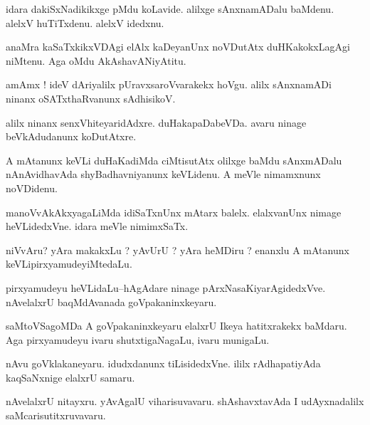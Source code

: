 \documentclass{article}
\begin{document}
\begin{mn}%
idara dakiSxNadikikxge pMdu koLavide. alilxge sAnxnamADalu baMdenu. alelxV huTiTxdenu. 
alelxV idedxnu.
\end{mn}

\begin{mn}%
anaMra kaSaTxkikxVDAgi elAlx kaDeyanUnx noVDutAtx duHKakokxLagAgi niMtenu. Aga oMdu 
AkAshavANiyAtitu.
\end{mn}

\begin{mn}%
amAmx ! ideV dAriyalilx pUravxsaroVvarakekx hoVgu. alilx sAnxnamADi ninanx oSATxthaRvanunx 
sAdhisikoV.
\end{mn}

\begin{mn}%
alilx ninanx senxVhiteyaridAdxre. duHakapaDabeVDa. avaru ninage beVkAdudanunx koDutAtxre.
\end{mn}

\begin{mn}%
A mAtanunx keVLi duHaKadiMda ciMtisutAtx olilxge baMdu sAnxmADalu nAnAvidhavAda 
shyBadhavniyanunx keVLidenu. A meVle nimamxnunx noVDidenu.
\end{mn}

\begin{mn}%
manoVvAkAkxyagaLiMda idiSaTxnUnx mAtarx balelx. elalxvanUnx nimage heVLidedxVne. idara 
meVle nimimxSaTx.
\end{mn}

\begin{mn}%
niVvAru? yAra makakxLu ? yAvUrU ? yAra heMDiru ? enanxlu A mAtanunx keVLipirxyamudeyiMtedaLu.
\end{mn}

\begin{mn}%
pirxyamudeyu heVLidaLu--hAgAdare ninage pArxNasaKiyarAgidedxVve. nAvelalxrU baqMdAvanada 
goVpakaninxkeyaru.
\end{mn}

\begin{mn}%
saMtoVSagoMDa A goVpakaninxkeyaru elalxrU Ikeya hatitxrakekx baMdaru. Aga pirxyamudeyu 
ivaru shutxtigaNagaLu, ivaru munigaLu.
\end{mn}

\begin{mn}%
nAvu goVklakaneyaru. idudxdanunx tiLisidedxVne. ililx rAdhapatiyAda kaqSaNxnige elalxrU 
samaru.
\end{mn}

\begin{mn}%
nAvelalxrU nitayxru. yAvAgalU viharisuvavaru. shAshavxtavAda I udAyxnadalilx 
saMcarisutitxruvavaru.
\end{mn}
\end{document}
